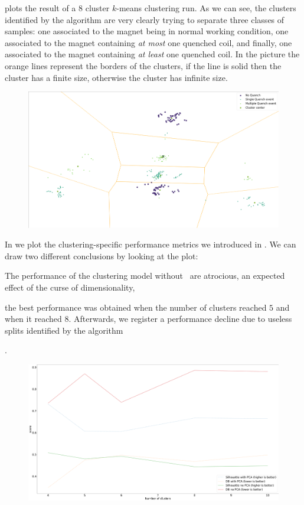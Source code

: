  plots the result of a $8$ cluster $k$-means clustering run. As we can see,
the clusters identified by the algorithm are very clearly trying to separate three classes of
samples: one associated to the magnet being in normal working condition, one associated to the
magnet containing \emph{at most} one quenched coil, and finally, one associated to the magnet
containing \emph{at least} one quenched coil. In the picture the orange lines represent the borders
of the clusters, if the line is solid then the cluster has a finite size, otherwise the cluster has
infinite size.
\begin{figure}[!ht]
	\centering
	\includegraphics[width=\textwidth]{img/clustering_an_qlp.png}
	\caption{}\label{fig:clustering-an}
\end{figure}
In  we plot the clustering-specific performance metrics we introduced in
. We can draw two different conclusions by looking at the plot:
\begin{inparaenum}[(i)]
	\item The performance of the clustering model without \pca\ are atrocious, an expected effect of the
	curse of dimensionality,
	\item the best performance was obtained when the number of clusters reached $5$ and when it
	reached $8$. Afterwards, we register a performance decline due to useless splits identified by the algorithm
\end{inparaenum}.
\begin{figure}[!ht]
	\centering
	\includegraphics[width=\textwidth]{img/clustering_scores_an.png}
	\caption{}\label{fig:cluster-score-an}
\end{figure}

